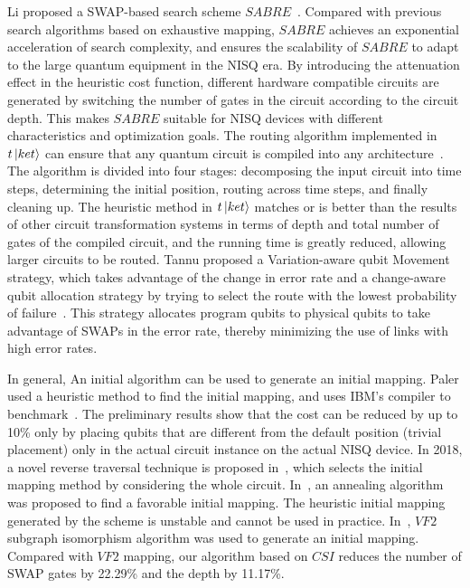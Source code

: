 \documentclass[runningheads]{llncs}
\begin{document}
\begin{enumerate}
	Li proposed a SWAP-based search scheme $SABRE$~\cite{Li2018}. 
	Compared with previous search algorithms based on exhaustive mapping, 
	$SABRE$ achieves an exponential acceleration of search complexity,
	and ensures the scalability of $SABRE$ to adapt to the large 
	quantum equipment in the NISQ era.
	By introducing the attenuation effect in the heuristic cost function, 
	different hardware compatible circuits are generated by switching the number 
	of gates in the circuit according to the circuit depth.
	This makes $SABRE$ suitable for NISQ devices with different characteristics and optimization goals.
	The routing algorithm implemented in $t\left\vert{ket}\right\rangle$ can ensure 
	that any quantum circuit is compiled into any architecture~\cite{Cowtan2019}.
	The algorithm is divided into four stages: 
	decomposing the input circuit into time steps, 
	determining the initial position, 
	routing across time steps, and finally cleaning up.
	The heuristic method in $t\left\vert{ket}\right\rangle$ matches or is better than the results of 
	other circuit transformation systems in terms of depth and total number of gates of 
	the compiled circuit, and the running time is greatly reduced, allowing larger circuits to be routed.
	Tannu proposed a Variation-aware qubit Movement strategy, 
	which takes advantage of the change in error rate and a change-aware qubit allocation 
	strategy by trying to select the route with the lowest probability of failure~\cite{Tannu2019}. 
	This strategy allocates program qubits to physical qubits to take advantage 
	of SWAPs in the error rate, thereby minimizing the use of links with high error rates.
\end{enumerate} 
In general, An initial algorithm can be used to generate an initial mapping. 
Paler used a heuristic method to find the initial mapping, 
 and uses IBM's compiler to benchmark~\cite{Paler2018}. 
The preliminary results show that the cost can be reduced by up to 10\% only by placing qubits 
that are different from the default position (trivial placement) only in the actual circuit instance 
on the actual NISQ device. In 2018, a novel reverse traversal technique is proposed in~\cite{Li2018}, 
which selects the initial mapping method by considering the whole circuit. 
In~\cite{Xiangzhen2020}, an annealing algorithm was proposed to find a favorable 
initial mapping. 
The heuristic initial mapping generated by the scheme is unstable 
and cannot be used in practice. In~\cite{2020Qubit}, 
$VF2$ subgraph isomorphism algorithm was 
used to generate an initial mapping. 
Compared with $VF2$ mapping, our algorithm 
based on $CSI$ reduces 
the number of SWAP gates by 22.29\% and the depth by 11.17\%.
\end{document}
